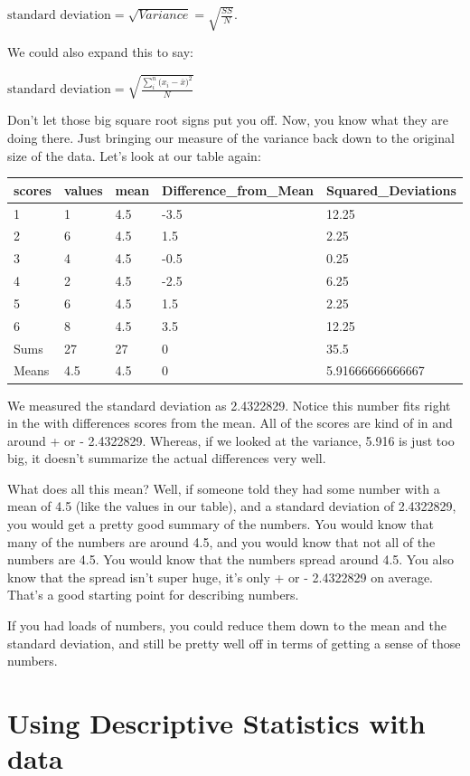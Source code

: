\documentclass[
]{book}
\begin{document}
\(\text{standard deviation} = \sqrt{Variance} = \sqrt{\frac{SS}{N}}\).

We could also expand this to say:

\(\text{standard deviation} = \sqrt{\frac{\sum_{i}^{n}({x_{i}-\bar{x})^2}}{N}}\)

Don't let those big square root signs put you off. Now, you know what they are doing there. Just bringing our measure of the variance back down to the original size of the data. Let's look at our table again:

\begin{tabular}{l|l|l|l|l}
\hline
scores & values & mean & Difference\_from\_Mean & Squared\_Deviations\\
\hline
1 & 1 & 4.5 & -3.5 & 12.25\\
\hline
2 & 6 & 4.5 & 1.5 & 2.25\\
\hline
3 & 4 & 4.5 & -0.5 & 0.25\\
\hline
4 & 2 & 4.5 & -2.5 & 6.25\\
\hline
5 & 6 & 4.5 & 1.5 & 2.25\\
\hline
6 & 8 & 4.5 & 3.5 & 12.25\\
\hline
Sums & 27 & 27 & 0 & 35.5\\
\hline
Means & 4.5 & 4.5 & 0 & 5.91666666666667\\
\hline
\end{tabular}

We measured the standard deviation as 2.4322829. Notice this number fits right in the with differences scores from the mean. All of the scores are kind of in and around + or - 2.4322829. Whereas, if we looked at the variance, 5.916 is just too big, it doesn't summarize the actual differences very well.

What does all this mean? Well, if someone told they had some number with a mean of 4.5 (like the values in our table), and a standard deviation of 2.4322829, you would get a pretty good summary of the numbers. You would know that many of the numbers are around 4.5, and you would know that not all of the numbers are 4.5. You would know that the numbers spread around 4.5. You also know that the spread isn't super huge, it's only + or - 2.4322829 on average. That's a good starting point for describing numbers.

If you had loads of numbers, you could reduce them down to the mean and the standard deviation, and still be pretty well off in terms of getting a sense of those numbers.

\section{Using Descriptive Statistics with data}\label{using-descriptive-statistics-with-data}
\end{document}
